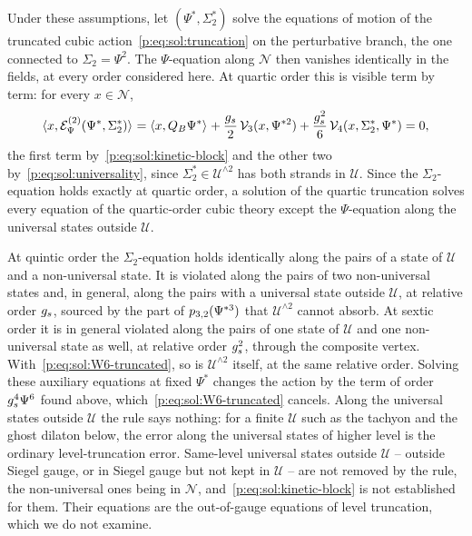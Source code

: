 Under these assumptions, let $(\Psi^*, \Sigma_2^*)$ solve the equations of motion of the truncated cubic action~\eqref{p:eq:sol:truncation} on the perturbative branch, the one connected to $\Sigma_2 = \Psi^2$.
The $\Psi$-equation along $\mathcal N$ then vanishes identically in the fields, at every order considered here.
At quartic order this is visible term by term: for every $x \in \mathcal N$,
\begin{equation}
  \label{p:eq:sol:lemma}
  \braket{x, \mathcal E^{(2)}_\Psi(\Psi^*, \Sigma_2^*)}_{}
    = \braket{x, Q_B \Psi^*}_{}
      + \frac{g_s}{2} \, \mathcal{V}_{3}(x, \Psi^{* 2})
      + \frac{g_s^2}{6} \, \mathcal{V}_{4}(x, \Sigma_2^*, \Psi^*)
    = 0,
\end{equation}
the first term by~\eqref{p:eq:sol:kinetic-block} and the other two by~\eqref{p:eq:sol:universality}, since $\Sigma_2^* \in \mathcal U^{\wedge 2}$ has both strands in $\mathcal U$.
Since the $\Sigma_2$-equation holds exactly at quartic order, a solution of the quartic truncation solves every equation of the quartic-order cubic theory except the $\Psi$-equation along the universal states outside $\mathcal U$.

At quintic order the $\Sigma_2$-equation holds identically along the pairs of a state of $\mathcal U$ and a non-universal state.
It is violated along the pairs of two non-universal states and, in general, along the pairs with a universal state outside $\mathcal U$, at relative order $g_s$, sourced by the part of $p_{3,2}(\Psi^{* 3})$ that $\mathcal U^{\wedge 2}$ cannot absorb.
At sextic order it is in general violated along the pairs of one state of $\mathcal U$ and one non-universal state as well, at relative order $g_s^2$, through the composite vertex.
With~\eqref{p:eq:sol:W6-truncated}, so is $\mathcal U^{\wedge 2}$ itself, at the same relative order.
Solving these auxiliary equations at fixed $\Psi^*$ changes the action by the term of order $g_s^4 \Psi^6$ found above, which~\eqref{p:eq:sol:W6-truncated} cancels.
Along the universal states outside $\mathcal U$ the rule says nothing: for a finite $\mathcal U$ such as the tachyon and the ghost dilaton below, the error along the universal states of higher level is the ordinary level-truncation error.
Same-level universal states outside $\mathcal U$ – outside Siegel gauge, or in Siegel gauge but not kept in $\mathcal U$ – are not removed by the rule, the non-universal ones being in $\mathcal N$, and~\eqref{p:eq:sol:kinetic-block} is not established for them.
Their equations are the out-of-gauge equations of level truncation, which we do not examine.

